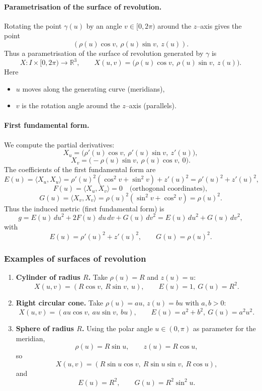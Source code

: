 \documentclass[12pt,a4paper]{article}
\theoremstyle{plain}
\theoremstyle{definition}      %
\begin{document}
	\paragraph{Parametrisation of the surface of revolution.}
	Rotating the point $\gamma(u)$ by an angle $v\in[0,2\pi)$ around the $z$--axis
	gives the point
	\[
	(\rho(u)\cos v,\ \rho(u)\sin v,\ z(u)).
	\]
	Thus a parametrisation of the surface of revolution generated by $\gamma$ is
	\[
	X:I\times[0,2\pi)\to\mathbb{R}^3,\qquad
	X(u,v) = \bigl(\rho(u)\cos v,\ \rho(u)\sin v,\ z(u)\bigr).
	\]
	Here
	\begin{itemize}
		\item $u$ moves along the generating curve (meridians),
		\item $v$ is the rotation angle around the $z$--axis (parallels).
	\end{itemize}
	
	\paragraph{First fundamental form.}
	We compute the partial derivatives:
	\[
	X_u = \bigl(\rho'(u)\cos v,\ \rho'(u)\sin v,\ z'(u)\bigr),
	\]
	\[
	X_v = \bigl(-\rho(u)\sin v,\ \rho(u)\cos v,\ 0\bigr).
	\]
	The coefficients of the first fundamental form are
	\[
	E(u) = \langle X_u,X_u\rangle
	= \rho'(u)^2(\cos^2 v+\sin^2 v)+z'(u)^2
	= \rho'(u)^2+z'(u)^2,
	\]
	\[
	F(u) = \langle X_u,X_v\rangle = 0
	\quad\text{(orthogonal coordinates)},
	\]
	\[
	G(u) = \langle X_v,X_v\rangle
	= \rho(u)^2(\sin^2 v+\cos^2 v)
	= \rho(u)^2.
	\]
	Thus the induced metric (first fundamental form) is
	\[
	g = E(u)\,du^2 + 2F(u)\,du\,dv + G(u)\,dv^2
	= E(u)\,du^2 + G(u)\,dv^2,
	\]
	with
	\[
	E(u)=\rho'(u)^2+z'(u)^2,\qquad G(u)=\rho(u)^2.
	\]
	
	\subsubsection*{Examples of surfaces of revolution}
	
	\begin{enumerate}
		\item \textbf{Cylinder of radius $R$.}
		Take $\rho(u)=R$ and $z(u)=u$:
		\[
		X(u,v) = (R\cos v,\ R\sin v,\ u),\qquad
		E(u)=1,\ G(u)=R^2.
		\]
		
		\item \textbf{Right circular cone.}
		Take $\rho(u)=au$, $z(u)=bu$ with $a,b>0$:
		\[
		X(u,v) = (au\cos v,\ au\sin v,\ bu),\qquad
		E(u)=a^2+b^2,\ G(u)=a^2u^2.
		\]
		
		\item \textbf{Sphere of radius $R$.}
		Using the polar angle $u\in(0,\pi)$ as parameter for the meridian,
		\[
		\rho(u)=R\sin u,\qquad z(u)=R\cos u,
		\]
		so
		\[
		X(u,v) = (R\sin u\cos v,\ R\sin u\sin v,\ R\cos u),
		\]
		and
		\[
		E(u) = R^2,\qquad G(u) = R^2\sin^2 u.
		\]
	\end{enumerate}
	
\end{document}
